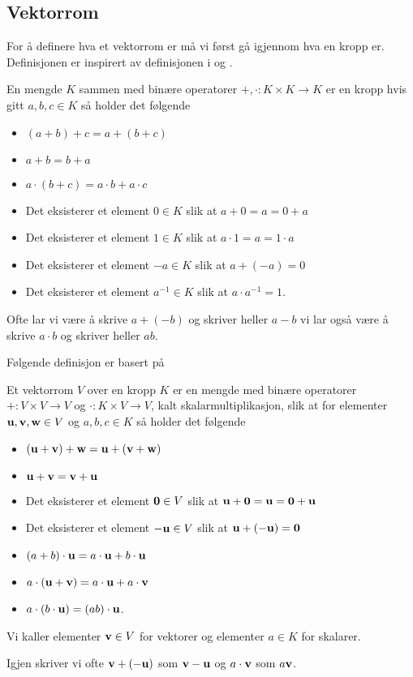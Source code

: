 \subsection{Vektorrom}\label{Sec:Vekt}
For å definere hva et vektorrom er må vi først gå igjennom
hva en kropp er. Definisjonen er inspirert av definisjonen
i \citep[definisjon 1.1 kapittel 3]{Hungerford2012} og
\citep[definisjon 1.5 kapittel 3]{Hungerford2012}.

\begin{definisjon}\label{Def:Kropp}
   En mengde $K$ sammen med binære operatorer $+,\cdot:
   K\times K\to K$ er en kropp hvis gitt $a,b,c\in K$ så
   holder det følgende
   \begin{itemize}
    \item $(a+b)+c = a+(b+c)$
    \item $a+b = b+a$
    \item $a\cdot(b+c)=a\cdot b + a\cdot c$
    \item Det eksisterer et element $0\in K$ slik at
      $a+0=a=0+a$
    \item Det eksisterer et element $1\in K$ slik at
      $a\cdot 1 = a = 1\cdot a$
    \item Det eksisterer et element $-a\in K$ slik at $a+
      (-a) = 0$
    \item Det eksisterer et element $a^{-1}\in K$ slik at
      $a\cdot a^{-1}=1$.
   \end{itemize}
\end{definisjon}
Ofte lar vi være å skrive $a+(-b)$ og skriver heller $a-b$
vi lar også være å skrive $a\cdot b$ og skriver heller
$ab$.

Følgende definisjon er basert på \citep[definisjon
1.1 kapittel 4]{Hungerford2012}
\begin{definisjon}\label{Def:Vektrom}
    Et vektorrom $V$ over en kropp $K$ er en mengde med binære operatorer $+:V\times V\to V$ og $\cdot: K\times
V\to V$, kalt skalarmultiplikasjon, slik at for elementer $\textbf{u},\textbf{v},\textbf{w}\in V$ og $a,b,c\in K$ så holder det følgende
    \begin{itemize}
    \item $(\textbf{u}+\textbf{v})+\textbf{w} = \textbf{u}+(\textbf{v}+\textbf{w})$
    \item $\textbf{u}+\textbf{v}=\textbf{v}+\textbf{u}$
    \item Det eksisterer et element $\textbf{0}\in V$ slik at $\textbf{u}+\textbf{0}=\textbf{u}=\textbf{0}+\textbf{u}$
    \item Det eksisterer et element $-\textbf{u}\in V$ slik at $\textbf{u}+(-\textbf{u})=\textbf{0}$
    \item $(a+b)\cdot \textbf{u} = a\cdot \textbf{u} + b\cdot \textbf{u}$
    \item $a\cdot(\textbf{u}+\textbf{v}) = a\cdot \textbf{u} + a\cdot \textbf{v}$
    \item $a\cdot (b\cdot \textbf{u}) = (ab)\cdot \textbf{u}$.
    \end{itemize}
    Vi kaller elementer $\textbf{v}\in V$ for vektorer og elementer $a\in K$ for skalarer.
\end{definisjon}
Igjen skriver vi ofte $\textbf{v}+(-\textbf{u})$ som $\textbf{v}-\textbf{u}$ og $a\cdot \textbf{v}$ som $a\textbf{v}$.

